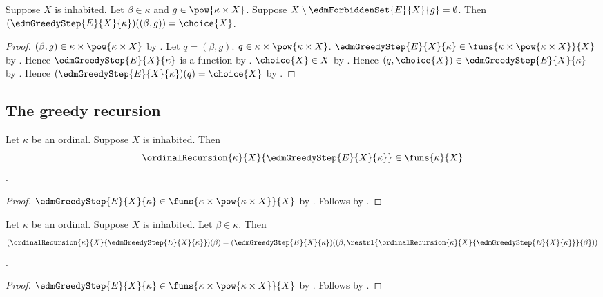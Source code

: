 \begin{proposition}\label{edm_greedy_step_empty}
    Suppose $X$ is inhabited.
    Let $\beta\in\kappa$ and
        $g\in\pow{\kappa\times X}$.
    Suppose $X\setminus\edmForbiddenSet{E}{X}{g}=\emptyset$.
    Then $(\edmGreedyStep{E}{X}{\kappa})((\beta,g))=\choice{X}$.
\end{proposition}
\begin{proof}
    $(\beta,g)\in\kappa\times\pow{\kappa\times X}$ by
        .
    Let $q=(\beta,g)$.
    $q\in\kappa\times\pow{\kappa\times X}$.
    $\edmGreedyStep{E}{X}{\kappa}
        \in\funs{\kappa\times\pow{\kappa\times X}}{X}$ by
        .
    Hence $\edmGreedyStep{E}{X}{\kappa}$ is a function by
        .
    $\choice{X}\in X$ by .
    Hence $(q,\choice{X})\in\edmGreedyStep{E}{X}{\kappa}$ by
        .
    Hence $(\edmGreedyStep{E}{X}{\kappa})(q)=\choice{X}$ by
        .
\end{proof}

\subsection{The greedy recursion}

\begin{proposition}\label{edm_greedy_recursion_type}
    Let $\kappa$ be an ordinal.
    Suppose $X$ is inhabited.
    Then
    \[
        \ordinalRecursion{\kappa}{X}{\edmGreedyStep{E}{X}{\kappa}}
            \in\funs{\kappa}{X}
    \].
\end{proposition}
\begin{proof}
    $\edmGreedyStep{E}{X}{\kappa}
        \in\funs{\kappa\times\pow{\kappa\times X}}{X}$ by
        .
    Follows by .
\end{proof}

\begin{proposition}\label{edm_greedy_recursion_equation}
    Let $\kappa$ be an ordinal.
    Suppose $X$ is inhabited.
    Let $\beta\in\kappa$.
    Then
    \[
        (\ordinalRecursion{\kappa}{X}
            {\edmGreedyStep{E}{X}{\kappa}})(\beta)
        =(\edmGreedyStep{E}{X}{\kappa})
            ((\beta,\restrl{\ordinalRecursion{\kappa}{X}
                {\edmGreedyStep{E}{X}{\kappa}}}{\beta}))
    \].
\end{proposition}
\begin{proof}
    $\edmGreedyStep{E}{X}{\kappa}
        \in\funs{\kappa\times\pow{\kappa\times X}}{X}$ by
        .
    Follows by .
\end{proof}

